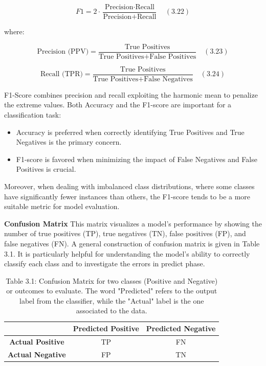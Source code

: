 \documentclass{Configuration_Files/PoliMi3i_thesis}
\begin{document}
\begin{equation}
F1 = 2 \cdot \frac{\text{Precision} \cdot \text{Recall}}{\text{Precision} + \text{Recall}} \quad (3.22)
\end{equation}

where:

\begin{equation}
\text{Precision (PPV)} = \frac{\text{True Positives}}{\text{True Positives} + \text{False Positives}} \quad (3.23)
\end{equation}

\begin{equation}
\text{Recall (TPR)} = \frac{\text{True Positives}}{\text{True Positives} + \text{False Negatives}} \quad (3.24)
\end{equation}

F1-Score combines precision and recall exploiting the harmonic mean to penalize the extreme values. Both Accuracy and the F1-score are important for a classification task:
\begin{itemize}
    \item Accuracy is preferred when correctly identifying True Positives and True Negatives is the primary concern.
    \item F1-score is favored when minimizing the impact of False Negatives and False Positives is crucial.
\end{itemize}

Moreover, when dealing with imbalanced class distributions, where some classes have significantly fewer instances than others, the F1-score tends to be a more suitable metric for model evaluation.


\textbf{Confusion Matrix} \quad This matrix visualizes a model’s performance by showing the number of true positives (TP), true negatives (TN), false positives (FP), and false negatives (FN). A general construction of confusion matrix is given in Table 3.1. It is particularly helpful for understanding the model’s ability to correctly classify each class and to investigate the errors in predict phase.

\begin{table}[H]
\centering
\caption*{Table 3.1: Confusion Matrix for two classes (Positive and Negative) or outcomes to evaluate. The word "Predicted" refers to the output label from the classifier, while the "Actual" label is the one associated to the data.}
\begin{tabular}{|c|c|c|}
\hline
 & \textbf{Predicted Positive} & \textbf{Predicted Negative} \\
\hline
\textbf{Actual Positive} & TP & FN \\
\hline
\textbf{Actual Negative} & FP & TN \\
\hline
\end{tabular}
\end{table}
\end{document}
